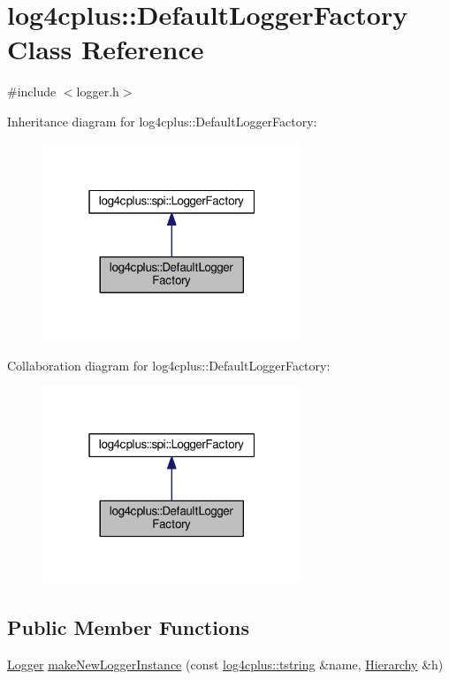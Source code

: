 \hypertarget{classlog4cplus_1_1DefaultLoggerFactory}{\section{log4cplus\-:\-:Default\-Logger\-Factory Class Reference}
\label{classlog4cplus_1_1DefaultLoggerFactory}
}


{\ttfamily \#include $<$logger.\-h$>$}



Inheritance diagram for log4cplus\-:\-:Default\-Logger\-Factory\-:
\nopagebreak
\begin{figure}[H]
\begin{center}
\leavevmode
\includegraphics[width=220pt]{classlog4cplus_1_1DefaultLoggerFactory__inherit__graph}
\end{center}
\end{figure}


Collaboration diagram for log4cplus\-:\-:Default\-Logger\-Factory\-:
\nopagebreak
\begin{figure}[H]
\begin{center}
\leavevmode
\includegraphics[width=220pt]{classlog4cplus_1_1DefaultLoggerFactory__coll__graph}
\end{center}
\end{figure}
\subsection*{Public Member Functions}
\begin{DoxyCompactItemize}
\item 
\hyperlink{classlog4cplus_1_1Logger}{Logger} \hyperlink{classlog4cplus_1_1DefaultLoggerFactory_a7b5dee8d67f2bf0b839c64b6721fb525}{make\-New\-Logger\-Instance} (const \hyperlink{namespacelog4cplus_a3c9287f6ebcddc50355e29d71152117b}{log4cplus\-::tstring} \&name, \hyperlink{classlog4cplus_1_1Hierarchy}{Hierarchy} \&h)
\end{DoxyCompactItemize}


